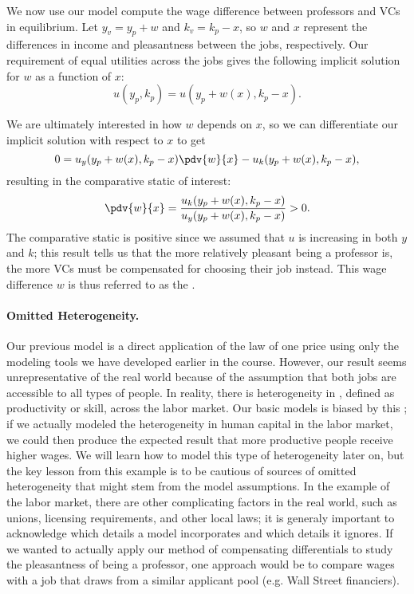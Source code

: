We now use our model compute the wage difference between professors and VCs in equilibrium. Let $y_v = y_p + w$ and $k_v = k_p - x$, so $w$ and $x$ represent the differences in income and pleasantness between the jobs, respectively. Our requirement of equal utilities across the jobs gives the following implicit solution for $w$ as a function of $x$:
$$u(y_p, k_p) = u(y_p + w(x), k_p - x).$$

We are ultimately interested in how $w$ depends on $x$, so we can differentiate our implicit solution with respect to $x$ to get 
$$0 = u_y(y_p + w(x), k_p - x)\pdv{w}{x} - u_k(y_p + w(x), k_p - x),$$
resulting in the comparative static of interest:
$$\pdv{w}{x} = \frac{u_k(y_p + w(x), k_p - x)}{u_y(y_p + w(x), k_p - x)} > 0.$$
The comparative static is positive since we assumed that $u$ is increasing in both $y$ and $k$; this result tells us that the more relatively pleasant being a professor is, the more VCs must be compensated for choosing their job instead. This wage difference $w$ is thus referred to as the .


\paragraph{Omitted Heterogeneity.} Our previous model is a direct application of the law of one price using only the modeling tools we have developed earlier in the course. However, our result seems unrepresentative of the real world because of the assumption that both jobs are accessible to all types of people. In reality, there is heterogeneity in , defined as productivity or skill, across the labor market. Our basic models is biased by this ; if we actually modeled the heterogeneity in human capital in the labor market, we could then produce the expected result that more productive people receive higher wages. We will learn how to model this type of heterogeneity later on, but the key lesson from this example is to be cautious of sources of omitted heterogeneity that might stem from the model assumptions. In the example of the labor market, there are other complicating factors in the real world, such as unions, licensing requirements, and other local laws; it is generaly important to acknowledge which details a model incorporates and which details it ignores. If we wanted to actually apply our method of compensating differentials to study the pleasantness of being a professor, one approach would be to compare wages with a job that draws from a similar applicant pool (e.g. Wall Street financiers).

